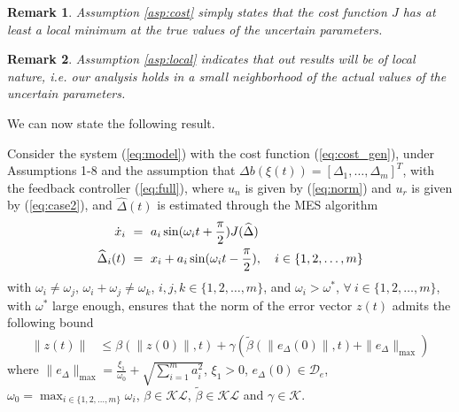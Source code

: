 \documentclass[twoside,leqno,onecolumn]{article}
\newtheorem{remark}{Remark}
\begin{document}
\begin{remark}
Assumption \ref{asp:cost} simply states that the cost function $J$ has at least a local minimum at the true values of the uncertain parameters.
\end{remark}

\begin{remark}
Assumption \ref{asp:local} indicates that out results will be of local nature, i.e. our analysis holds in a small neighborhood of the actual values of the uncertain parameters.
\end{remark}

We can now state the following result.
\begin{lemma}
\label{lem:case1} Consider the system (\ref{eq:model}) with the
cost function (\ref{eq:cost_gen}), under Assumptions 1-8 and the
assumption that $\Delta b(\xi(t)) = [\Delta_1,\dots,\Delta_m]^T$,
with the feedback controller (\ref{eq:full}), where $u_n$ is given
by (\ref{eq:norm}) and $u_r$ is given by (\ref{eq:case2}), and
$\widehat{\Delta}(t)$ is estimated through the MES algorithm
\begin{align}
\label{eq:mes}
\dot{x}_i~&=~a_i \sin(\omega_i t+ \frac{\pi}{2})J(\widehat{\Delta})\notag\\
\widehat{\Delta}_i(t)~&=~x_i+a_i\sin(\omega_i t - \frac{\pi}{2}), \quad i\in\{1,2,\dots,m\}
\end{align}
with $\omega_i\neq \omega_j$, $\omega_i + \omega_j\neq\omega_k$,
$i,j,k\in\{1,2,\dots,m\}$, and $\omega_i>\omega^*$, $\forall
~i\in\{1,2,\dots,m\}$, with $\omega^*$ large enough, ensures that
the norm of the error vector $z(t)$ admits the following bound
\begin{align*}
\|z(t)\|&\leq\beta(\|z(0)\|,t)
+ \gamma(\tilde{\beta}(\|e_\Delta(0)\|,t)+\|e_\Delta\|_{\max})
\end{align*}
where $\|e_\Delta\|_{\max} = \frac{\xi_1}{\omega_0} + \sqrt{\sum_{i = 1}^m a_i^2}$, $\xi_1>0$, $e_\Delta(0)\in\mathcal{D}_e$, $\omega_0 = \max_{i\in\{1,2,\dots,m\}} \omega_i$, $\beta\in\mathcal{KL}$, $\tilde{\beta}\in\mathcal{KL}$ and $\gamma\in\mathcal{K}$.
\end{lemma}
\end{document}
